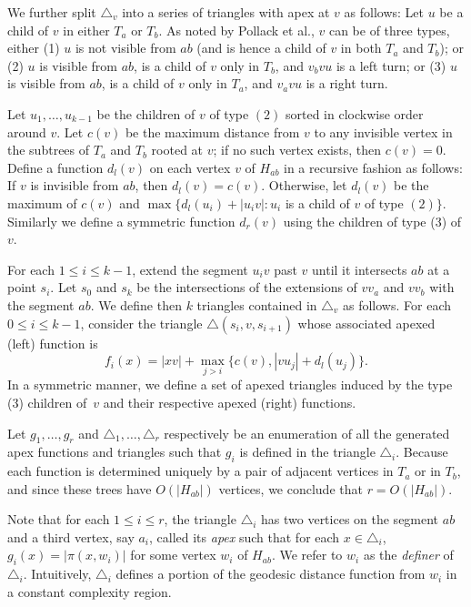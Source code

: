 \documentclass[a4paper,UKenglish]{lipics}
\newcommand{\g}[2]{\ensuremath{|\pi(#1, #2)|}}
\begin{document}
We further split $\triangle_v$ into a series of triangles with apex at $v$ as follows: 
Let $u$ be a child of $v$ in either $T_a$ or $T_b$. As noted by Pollack et al., $v$ can be of three types, either (1) $u$ is not visible from $ab$ (and is hence a child of $v$ in both $T_a$ and $T_b$); or (2) $u$ is visible from $ab$, is a child of $v$ only in $T_b$, and $v_b v u$ is a left turn; or (3) $u$ is visible from $ab$, is a child of $v$ only in $T_a$, and $v_a v u$ is a right turn.

Let $u_1, \ldots, u_{k-1}$ be the children of $v$ of type $(2)$ sorted in clockwise order around $v$.
Let $c(v)$ be the maximum distance from $v$ to any invisible vertex in the subtrees of $T_a$ and $T_b$ rooted at $v$; if no such vertex exists, then $c(v) = 0$. 
Define a function $d_l(v)$ on each vertex $v$ of $H_{ab}$ in a recursive fashion as follows:
If $v$ is invisible from $ab$, then $d_l(v) = c(v)$. 
Otherwise, let $d_l(v)$ be the maximum of $c(v)$ and $\max\{d_l(u_i) + |u_iv| : u_i$ is a child of $v$ of type $(2)\}$.
Similarly we define a symmetric function $d_r(v)$ using the children of type (3) of $v$.

For each $1\leq i\leq k-1$, extend the segment $u_iv$ past $v$ until it intersects $ab$ at a point $s_i$. Let $s_0$ and $s_k$ be the intersections of the extensions of $vv_a$ and $vv_b$ with the segment $ab$.
We define then $k$ triangles contained in $\triangle_v$ as follows. 
For each $0\leq i\leq k-1$, consider the triangle $\triangle(s_i, v, s_{i+1})$ whose associated apexed (left) function is 
$$f_i(x) = |xv| + \max_{j>i}\{c(v), |vu_j| + d_l(u_j)\}.$$
In a symmetric manner, we define a set of apexed triangles induced by the type (3) children of~$v$ and their respective apexed (right) functions.

Let $g_1, \ldots, g_r$ and $\triangle_1, \ldots, \triangle_r$ respectively be an enumeration of all the generated apex functions and triangles such that $g_i$ is defined in the triangle $\triangle_i$. Because each function is determined uniquely by a pair of adjacent vertices in $T_a$ or in $T_b$, and since these trees have $O(|H_{ab}|)$ vertices, we conclude that $r = O(|H_{ab}|)$. 

Note that for each $1\leq i\leq r$, the triangle $\triangle_i$ has two vertices on the segment $ab$ and a third vertex, say $a_i$, called its \emph{apex} such that for each $x\in \triangle_i$, $g_i(x) = \g{x}{w_i}$ for some vertex $w_i$ of $H_{ab}$. We refer to $w_i$ as the \emph{definer} of $\triangle_i$. Intuitively, $\triangle_i$ defines a portion of the geodesic distance function from $w_i$ in a constant complexity region. 
\end{document}
